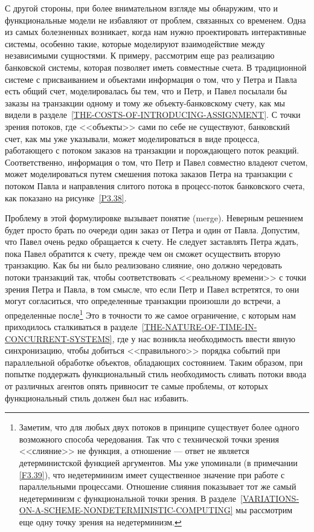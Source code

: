 С другой стороны, при более внимательном взгляде мы
обнаружим, что и функциональные модели не избавляют от проблем,
связанных со временем.  Одна из самых болезненных возникает, когда нам
нужно проектировать интерактивные системы, особенно такие, которые
моделируют взаимодействие между независимыми сущностями.  К примеру,
рассмотрим еще раз реализацию банковской системы, которая позволяет
иметь совместные счета.  В традиционной системе с присваиванием и
объектами информация о том, что у Петра и Павла есть общий счет,
моделировалась бы тем, что и Петр, и Павел посылали бы заказы на
транзакции одному и тому же объекту-банковскому счету, как мы видели в
разделе~\ref{THE-COSTS-OF-INTRODUCING-ASSIGNMENT}.  С точки зрения
потоков, где <<объекты>> сами по себе не существуют, банковский счет,
как мы уже указывали, может моделироваться в виде процесса,
работающего с потоком заказов на транзакции и порождающего поток
реакций.  Соответственно, информация о том, что Петр и Павел совместно
владеют счетом, может моделироваться путем смешения потока
заказов Петра на транзакции с потоком Павла и направления слитого потока в
 процесс-поток
банковского счета, как показано на
рисунке~\ref{P3.38}.

Проблему в этой формулировке вызывает понятие
 (merge).
Неверным решением будет просто
брать по очереди один заказ от Петра и один от Павла.  Допустим, что
Павел очень редко обращается к счету.  Не следует заставлять Петра
ждать, пока Павел обратится к счету, прежде чем он сможет осуществить
вторую транзакцию.  Как бы ни было реализовано слияние, оно должно
чередовать потоки транзакций так, чтобы соответствовать <<реальному
времени>> с точки зрения Петра и Павла, в том смысле, что если Петр и
Павел встретятся, то они могут согласиться, что определенные
транзакции произошли до встречи, а определенные после\footnote{Заметим, что для любых двух потоков в принципе
существует более одного возможного способа чередования. Так что с
технической точки зрения <<слияние>> не функция, а
отношение --- ответ
не является детерминистской функцией аргументов.  Мы уже упоминали (в
примечании \ref{F3.39}), что 
недетерминизм имеет
существенное значение при работе с параллельными процессами.
Отношение слияния показывает тот же самый недетерминизм с
функциональной точки зрения.  В
разделе~\ref{VARIATIONS-ON-A-SCHEME-NONDETERMINISTIC-COMPUTING} мы
рассмотрим еще одну точку зрения на \linebreak
недетерминизм.}
Это в точности то же самое ограничение, с которым нам приходилось
сталкиваться в
разделе~\ref{THE-NATURE-OF-TIME-IN-CONCURRENT-SYSTEMS},
где у нас
возникла необходимость ввести явную синхронизацию, чтобы добиться
<<правильного>> порядка событий при параллельной обработке объектов,
обладающих состоянием.  Таким образом, при попытке поддержать
функциональный стиль необходимость сливать потоки ввода от различных
агентов опять привносит те самые проблемы, от которых функциональный
стиль должен был нас \mbox{избавить}.

